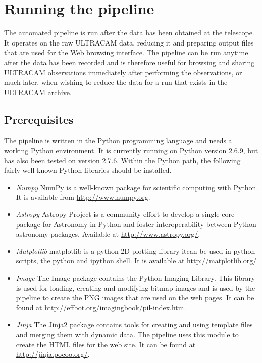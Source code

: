 \section{Running the pipeline}
The automated pipeline is run after the data has been obtained at the telescope. It operates on the raw ULTRACAM data, reducing it and preparing output files that are used for the Web browsing interface. The pipeline can be run anytime after the data has been recorded and is therefore useful for browsing and sharing ULTRACAM observations immediately after performing the observations, or much later, when wishing to reduce the data for a run that exists in the ULTRACAM archive.

\subsection{Prerequisites}
The pipeline is written in the Python programming language and needs a working Python environment. It is currently running on Python version 2.6.9, but has also been tested on version 2.7.6. Within the Python path, the following fairly well-known Python libraries should be installed. 
\begin{itemize}
  \item \emph{Numpy} NumPy is a well-known package for scientific computing with Python. It is available from \url{http://www.numpy.org}.
  \item \emph{Astropy} Astropy Project is a community effort to develop a single core package for Astronomy in Python and foster interoperability between Python astronomy packages. Available at \url{http://www.astropy.org/}.
  \item \emph{Matplotlib} matplotlib is a python 2D plotting library itcan be used in python scripts, the python and ipython shell. It is available at  \url{http://matplotlib.org/}
  \item \emph{Image} The Image package contains the Python Imaging Library. This library is used for loading, creating and modifying bitmap images and is used by the pipeline to create the PNG images that are used on the web pages. It can be found at \url{http://effbot.org/imagingbook/pil-index.htm}.
  \item \emph{Jinja} The Jinja2 package contains tools for creating and using template files and merging them with dynamic data. The pipeline uses this module to create the HTML files for the web site. It can be found at \url{http://jinja.pocoo.org/}.

\end{itemize}
